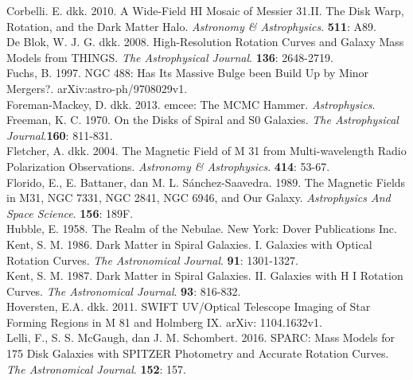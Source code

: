 \begin{thebibliography}{}
Corbelli. E. dkk. 2010. A Wide-Field HI Mosaic of Messier 31.II. The  Disk Warp, Rotation, and the Dark Matter Halo. \textit{Astronomy & Astrophysics}. \textbf{511}: A89.\\

De Blok, W. J. G. dkk. 2008. High-Resolution Rotation Curves and Galaxy Mass Models from THINGS. \textit{The Astrophysical Journal}. \textbf{136}: 2648-2719.\\

Fuchs, B. 1997. NGC 488: Has Its Massive Bulge been Build Up by Minor Mergers?. arXiv:astro-ph/9708029v1.\\

Foreman-Mackey, D. dkk.  2013. emcee: The MCMC Hammer. \textit{Astrophysics}.\\

Freeman, K. C. 1970. On the Disks of Spiral and S0 Galaxies. \textit{The Astrophysical Journal}.\textbf{160}: 811-831.\\

Fletcher, A. dkk. 2004. The Magnetic Field of M 31 from Multi-wavelength Radio Polarization Observations. \textit{Astronomy & Astrophysics}. \textbf{414}: 53-67. \\

Florido, E., E. Battaner, dan M. L. Sánchez-Saavedra. 1989. The Magnetic Fields in M31, NGC 7331, NGC 2841, NGC 6946, and Our Galaxy. \textit{Astrophysics And Space Science}. \textbf{156}: 189F. \\

Hubble, E. 1958. The Realm of the Nebulae. New York: Dover Publications Inc. \\

Kent, S. M. 1986. Dark Matter in Spiral Galaxies. I. Galaxies with Optical Rotation Curves. \textit{The Astronomical Journal}. \textbf{91}: 1301-1327. \\

Kent, S. M. 1987. Dark Matter in Spiral Galaxies. II. Galaxies with H I Rotation Curves.  \textit{The Astronomical Journal}. \textbf{93}: 816-832.\\

Hoversten, E.A. dkk. 2011. SWIFT UV/Optical Telescope Imaging of Star Forming Regions in M 81 and Holmberg IX. arXiv: 1104.1632v1.\\

Lelli, F., S. S.  McGaugh, dan J. M. Schombert. 2016. SPARC: Mass  Models for 175 Disk Galaxies with SPITZER  Photometry and Accurate Rotation Curves. \textit{The Astronomical Journal}.  \textbf{152}: 157. \\


\end{thebibliography}
